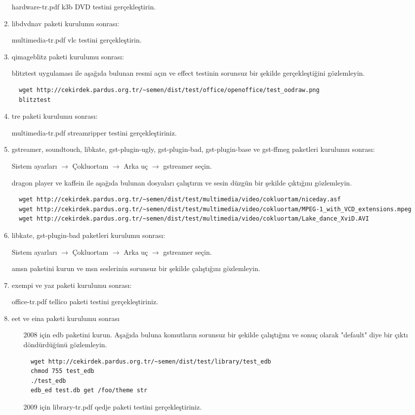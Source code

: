 \documentclass[a4paper,10pt]{article}
\begin{document}
\begin{enumerate}
hardware-tr.pdf k3b DVD testini gerçekleştirin.

\item libdvdnav paketi kurulumu sonrası:

multimedia-tr.pdf vlc testini gerçekleştirin.

\item qimageblitz paketi kurulumu sonrası:

blitztest uygulaması ile aşağıda bulunan resmi açın ve effect testinin sorunsuz bir şekilde gerçekleştiğini gözlemleyin.
\begin{verbatim}
  wget http://cekirdek.pardus.org.tr/~semen/dist/test/office/openoffice/test_oodraw.png
  blitztest
\end{verbatim}


\item tre paketi kurulumu sonrası:

multimedia-tr.pdf streamripper testini gerçekleştiriniz.

\item gstreamer, soundtouch, libkate, gst-plugin-ugly, gst-plugin-bad, gst-plugin-base ve gst-ffmeg paketleri kurulumu sonrası:

Sistem ayarları $\rightarrow$ Çokluortam $\rightarrow$ Arka uç $\rightarrow$ gstreamer seçin. 

dragon player ve kaffein ile aşağıda bulunan dosyaları çalıştırın ve sesin düzgün bir şekilde çıktığını gözlemleyin.
\begin{verbatim}
  wget http://cekirdek.pardus.org.tr/~semen/dist/test/multimedia/video/cokluortam/niceday.asf
  wget http://cekirdek.pardus.org.tr/~semen/dist/test/multimedia/video/cokluortam/MPEG-1_with_VCD_extensions.mpeg
  wget http://cekirdek.pardus.org.tr/~semen/dist/test/multimedia/video/cokluortam/Lake_dance_XviD.AVI
\end{verbatim}

\item libkate, gst-plugin-bad paketleri kurulumu sonrası:

Sistem ayarları $\rightarrow$ Çokluortam $\rightarrow$ Arka uç $\rightarrow$ gstreamer seçin. 

amsn paketini kurun ve msn seslerinin sorunsuz bir şekilde çalıştığını gözlemleyin.


\item exempi ve yaz paketi kurulumu sonrası:

office-tr.pdf tellico paketi testini gerçekleştiriniz.

\item eet ve eina paketi kurulumu sonrası
\begin{itemize}
 \item [2008 için] edb paketini kurun. Aşağıda buluna komutların sorunsuz bir şekilde çalıştığını ve sonuç olarak "default" diye bir çıktı döndürdüğünü gözlemleyin.
\begin{verbatim}
  wget http://cekirdek.pardus.org.tr/~semen/dist/test/library/test_edb
  chmod 755 test_edb
  ./test_edb
  edb_ed test.db get /foo/theme str
\end{verbatim}
\item [2009 için] library-tr.pdf qedje paketi testini gerçekleştiriniz.
\end{itemize}


\end{enumerate}
\end{document}
